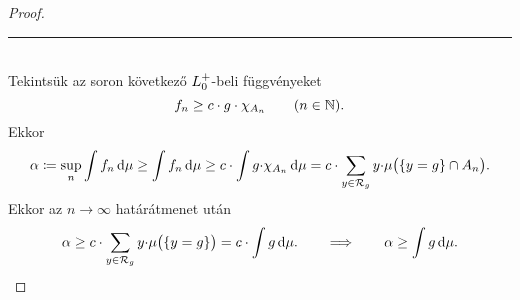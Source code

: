 \documentclass[
]{elteikthesis}[2024/04/26]
\begin{document}
\begin{proof}
		\noindent\rule{\linewidth}{0.4pt}\\
		
		Tekintsük az soron következő \( \StepFuncPlus \)-beli függvényeket
		\[
			f_n \geq c \cdot g \cdot \chi_{A_n} \qquad (n \in \mathbb{N}).
		\]
		Ekkor
		\[
			\alpha \coloneq 
			\sup_{n} \int f_n \mathop{}\!\mathrm{d}{\mu} \geq
			\int f_n \mathop{}\!\mathrm{d}{\mu} \geq 
			c \cdot \int g {\cdot} \chi_{A_n} \mathop{}\!\mathrm{d}{\mu} = 
			c \cdot \sum_{y \in \mathcal{R}_{g}} y {\cdot} \mu\bigl( \{ y = g \} \cap A_n \bigr).
		\]
		Ekkor az \( n \to \infty \) határátmenet után
		\[
			\alpha \geq 
			c \cdot \sum_{y \in \mathcal{R}_{g}} y {\cdot} \mu\bigl( \{ y = g \} \bigr) =
			c \cdot \int g \mathop{}\!\mathrm{d}{\mu}.
			\qquad \Longrightarrow \qquad
			\alpha \geq \int g \mathop{}\!\mathrm{d}{\mu}.
		\]
	\end{proof}
	
\end{document}
